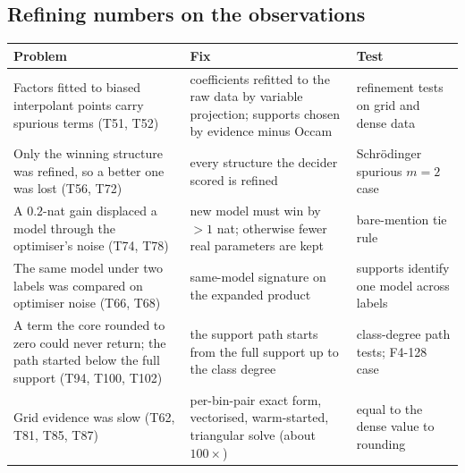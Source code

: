 \documentclass[11pt,a4paper]{article}
\theoremstyle{definition}
\begin{document}
\subsection{Refining numbers on the observations}
\begin{center}\small
\begin{tabular}{@{}L{4.1cm}L{4.4cm}L{4.4cm}@{}}
\toprule
Problem & Fix & Test\\\midrule
Factors fitted to biased interpolant points carry spurious terms (T51, T52) & coefficients refitted to the raw data by variable projection; supports chosen by evidence minus Occam & refinement tests on grid and dense data\\
Only the winning structure was refined, so a better one was lost (T56, T72) & every structure the decider scored is refined & Schr\"odinger spurious $m=2$ case\\
A $0.2$-nat gain displaced a model through the optimiser's noise (T74, T78) & new model must win by $>1$ nat; otherwise fewer real parameters are kept & bare-mention tie rule\\
The same model under two labels was compared on optimiser noise (T66, T68) & same-model signature on the expanded product & supports identify one model across labels\\
A term the core rounded to zero could never return; the path started below the full support (T94, T100, T102) & the support path starts from the full support up to the class degree & class-degree path tests; F4-128 case\\
Grid evidence was slow (T62, T81, T85, T87) & per-bin-pair exact form, vectorised, warm-started, triangular solve (about $100\times$) & equal to the dense value to rounding\\
\bottomrule
\end{tabular}
\end{center}
\end{document}
